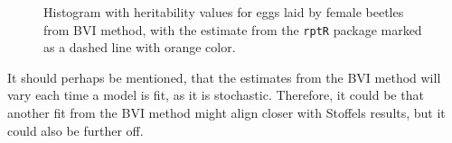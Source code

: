 \begin{figure}[H]
  \centering
  \caption{Histogram with heritability values for eggs laid by female beetles from BVI method, with the estimate from the \texttt{rptR} package marked as a dashed line with orange color.}
\end{figure}
\noindent It should perhaps be mentioned, that the estimates from the BVI method will vary each time a model is fit, as it is stochastic. Therefore, it could be that another fit from the BVI method might align closer with Stoffels results, but it could also be further off. 
